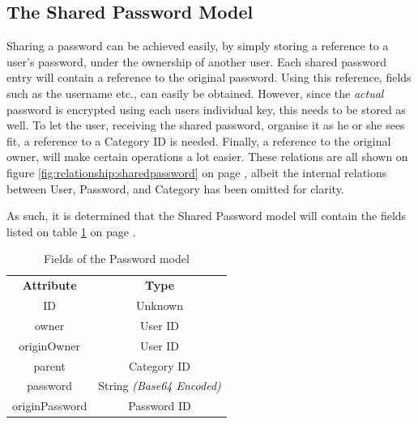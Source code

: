 		\subsection{The Shared Password Model}
			Sharing a password can be achieved easily, by simply storing a reference to a user's password, under the ownership of another user. Each shared password entry will contain a reference to the original password. Using this reference, fields such as the username etc., can easily be obtained. However, since the \emph{actual} password is encrypted using each users individual key, this needs to be stored as well. To let the user, receiving the shared password, organise it as he or she sees fit, a reference to a Category ID is needed. Finally, a reference to the original owner, will make certain operations a lot easier. These relations are all shown on figure \ref{fig:relationship:sharedpassword} on page \pageref{fig:relationship:sharedpassword}, albeit the internal relations between User, Password, and Category has been omitted for clarity.

			As such, it is determined that the Shared Password model will contain the fields listed on table \ref{fig:model:sharedpassword} on page \pageref{fig:model:sharedpassword}. 

			\begin{table}[p]
				\centering
				\begin{tabular}{c|c}
					\textbf{Attribute} 		& \textbf{Type} 		\\
					ID 						& Unknown 		\\
					owner 					& User ID \\
					originOwner 			& User ID \\
					parent 					& Category ID \\
					password 				& String \emph{(Base64 Encoded)} \\
					originPassword 			& Password ID 		\\
				\end{tabular}
				\caption{Fields of the Password model}
				\label{fig:model:sharedpassword}
			\end{table}

